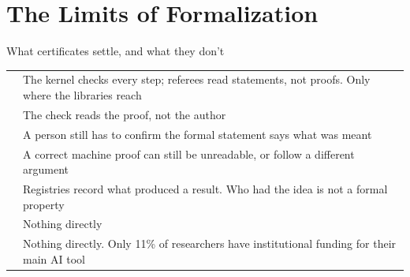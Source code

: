 \section{The Limits of Formalization}

\begin{frame}{What certificates settle, and what they don't}
  \footnotesize\sffamily
  \renewcommand{\arraystretch}{1.3}
  \begin{tabularx}{\linewidth}{@{}p{3.6cm}Y@{}}
    \toprule
     & \\
    \midrule
     & The kernel checks every step; referees read statements, not proofs. Only where the libraries reach\\
     & The check reads the proof, not the author\\
     & A person still has to confirm the formal statement says what was meant\\
     & A correct machine proof can still be unreadable, or follow a different argument\\
     & Registries record what produced a result. Who had the idea is not a formal property\\
     & Nothing directly\\
     & Nothing directly. Only 11\% of researchers have institutional funding for their main AI tool\\
    \bottomrule
  \end{tabularx}\par\vspace{0.6cm}
  {\centering{}\par}
\end{frame}
